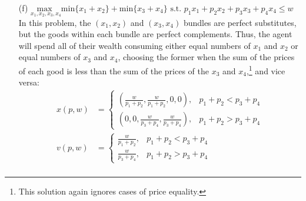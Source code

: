 \documentclass{article}
\newcommand{\usmax}[1]{\underset{#1}{\text{max }}}
\begin{document}
\begin{itemize}
	\item[(f)] $\usmax{x_1,x_2,x_3,x_4}\text{min}\{x_1+x_2\}+\text{min}\{x_3+x_4\}\text{ s.t. }p_1x_1+p_2x_2+p_3x_3+p_4x_4\leq w$
		\medskip \\
		In this problem, the $(x_1,x_2)$ and $(x_3,x_4)$ bundles are perfect substitutes, but the goods within each bundle are perfect complements. Thus, the agent will spend all of their wealth consuming either equal numbers of $x_1$ and $x_2$ or equal numbers of $x_3$ and $x_4$, choosing the former when the sum of the prices of each good is less than the sum of the prices of the $x_3$ and $x_4$,\footnote{This solution again ignores cases of price equality.} and vice versa:
		\begin{align*}
			x(p,w) &= 
					\begin{cases}
						\left(\frac{w}{p_1+p_2},\frac{w}{p_1+p_2},0,0\right), &p_1+p_2<p_3+p_4  \\
						\left(0,0,\frac{w}{p_3+p_4},\frac{w}{p_3+p_4}\right), &p_1+p_2>p_3+p_4 
					\end{cases}	\\
			v(p,w) &= 
					\begin{cases}
						\frac{w}{p_1+p_2}, &p_1+p_2<p_3+p_4  \\
						\frac{w}{p_3+p_4}, &p_1+p_2>p_3+p_4 
					\end{cases}	\\
		\end{align*}
		
	
\end{itemize}


\pagebreak
\end{document}
